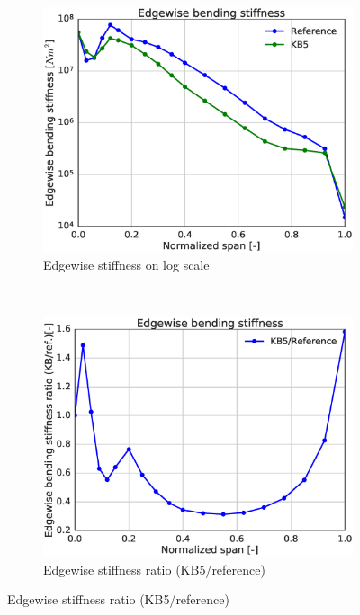\begin{figure}[tph]
\begin{subfigure}{0.50\textwidth}
\includegraphics[width=\linewidth]{figures/KB6_final/KB5_edgeStiff_log.eps}
\caption{Edgewise stiffness on log scale}
\label{subfig:KB5_edgestiff_log}
\end{subfigure}
 ~
\begin{subfigure}{0.50\textwidth}
\includegraphics[width=\linewidth]{figures/KB6_final/KB5_edgeStiff_ratio.eps}
\caption{Edgewise stiffness ratio (KB5/reference)}
\label{subfig:KB5_edgestiff_ratio}
\end{subfigure}


\end{figure}
